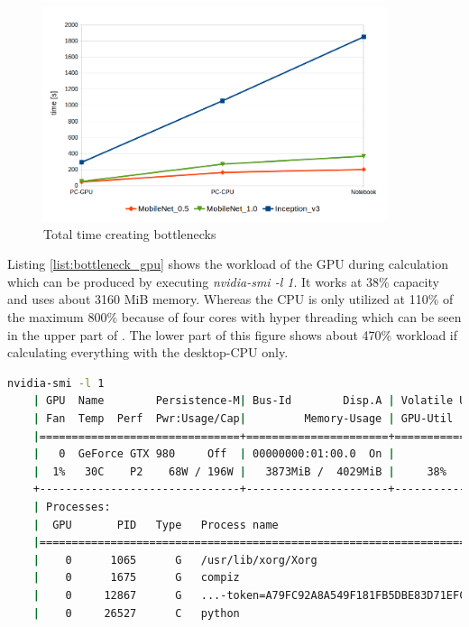 \begin{figure}[htbp]
\centering
\includegraphics[width=0.9\textwidth]{includes/bottlenecks}
\caption[Total time creating bottlenecks]{Total time creating bottlenecks}
\label{fig:bottlenecks}
\end{figure}

Listing \ref{list:bottleneck_gpu} shows the workload of the GPU during calculation which can be produced by executing \textit{nvidia-smi -l 1}. It works at 38\% capacity and uses about 3160 MiB memory. Whereas the CPU is only utilized at 110\% of the maximum 800\% because of four cores with hyper threading which can be seen in the upper part of . The lower part of this figure shows about 470\% workload if calculating everything with the desktop-CPU only. \\

\begin{minipage}{\linewidth}
\begin{lstlisting}[caption=Build and call of \textit{retrain}, label=list:bottleneck_gpu, language=bash]
	nvidia-smi -l 1
	| GPU  Name        Persistence-M| Bus-Id        Disp.A | Volatile Uncorr. ECC |
	| Fan  Temp  Perf  Pwr:Usage/Cap|         Memory-Usage | GPU-Util  Compute M. |
	|===============================+======================+======================|
	|   0  GeForce GTX 980     Off  | 00000000:01:00.0  On |                  N/A |
	|  1%   30C    P2    68W / 196W |   3873MiB /  4029MiB |     38%      Default |
	+-------------------------------+----------------------+----------------------+
	| Processes:                                                       GPU Memory |
	|  GPU       PID   Type   Process name                             Usage      |
	|=============================================================================|
	|    0      1065      G   /usr/lib/xorg/Xorg                           584MiB |
	|    0      1675      G   compiz                                        83MiB |
	|    0     12867      G   ...-token=A79FC92A8A549F181FB5DBE83D71EFC2    31MiB |
	|    0     26527      C   python                                      3159MiB |
\end{lstlisting}
\end{minipage}

